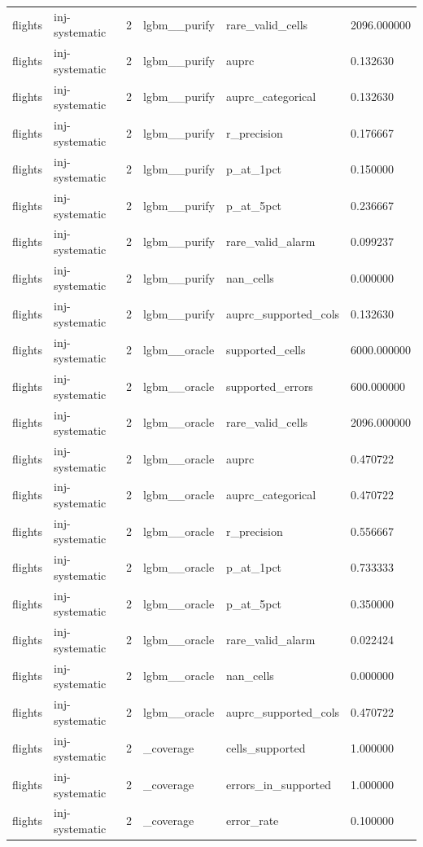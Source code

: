 \begin{tabular}{llllll}
flights & inj-systematic & 2 & lgbm\_\_purify & rare\_valid\_cells & 2096.000000 \\
flights & inj-systematic & 2 & lgbm\_\_purify & auprc & 0.132630 \\
flights & inj-systematic & 2 & lgbm\_\_purify & auprc\_categorical & 0.132630 \\
flights & inj-systematic & 2 & lgbm\_\_purify & r\_precision & 0.176667 \\
flights & inj-systematic & 2 & lgbm\_\_purify & p\_at\_1pct & 0.150000 \\
flights & inj-systematic & 2 & lgbm\_\_purify & p\_at\_5pct & 0.236667 \\
flights & inj-systematic & 2 & lgbm\_\_purify & rare\_valid\_alarm & 0.099237 \\
flights & inj-systematic & 2 & lgbm\_\_purify & nan\_cells & 0.000000 \\
flights & inj-systematic & 2 & lgbm\_\_purify & auprc\_supported\_cols & 0.132630 \\
flights & inj-systematic & 2 & lgbm\_\_oracle & supported\_cells & 6000.000000 \\
flights & inj-systematic & 2 & lgbm\_\_oracle & supported\_errors & 600.000000 \\
flights & inj-systematic & 2 & lgbm\_\_oracle & rare\_valid\_cells & 2096.000000 \\
flights & inj-systematic & 2 & lgbm\_\_oracle & auprc & 0.470722 \\
flights & inj-systematic & 2 & lgbm\_\_oracle & auprc\_categorical & 0.470722 \\
flights & inj-systematic & 2 & lgbm\_\_oracle & r\_precision & 0.556667 \\
flights & inj-systematic & 2 & lgbm\_\_oracle & p\_at\_1pct & 0.733333 \\
flights & inj-systematic & 2 & lgbm\_\_oracle & p\_at\_5pct & 0.350000 \\
flights & inj-systematic & 2 & lgbm\_\_oracle & rare\_valid\_alarm & 0.022424 \\
flights & inj-systematic & 2 & lgbm\_\_oracle & nan\_cells & 0.000000 \\
flights & inj-systematic & 2 & lgbm\_\_oracle & auprc\_supported\_cols & 0.470722 \\
flights & inj-systematic & 2 & \_coverage & cells\_supported & 1.000000 \\
flights & inj-systematic & 2 & \_coverage & errors\_in\_supported & 1.000000 \\
flights & inj-systematic & 2 & \_coverage & error\_rate & 0.100000 \\

\end{tabular}
